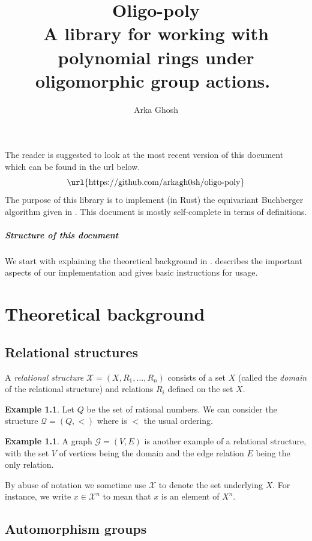 \documentclass[12pt,a4paper,article]{memoir}
\date{}
\title{Oligo-poly\\
\vspace{10pt}
\large
A library for working with polynomial rings under oligomorphic group actions.
$ $\\}
\author{Arka Ghosh}
\newcommand{\struct}{\mathcal{X}}
\newcommand{\dloQ}{\mathcal{Q}}
\newcommand{\emphdef}[1]{\emph{\textcolor{BrickRed}{#1}}}
\theoremstyle{definition}
\newtheorem{example}[theorem]{Example}
\begin{document}
\maketitle
\raggedbottom
%
\tableofcontents
%
\pagebreak
\noindent
The reader is suggested to look at the most recent version of this document which can be found in the url below.
\[
\text{
\url{https://github.com/arkagh0sh/oligo-poly}
}
\]
The purpose of this library is to implement (in Rust) the equivariant Buchberger algorithm given in \cite{GL25}.
This document is mostly self-complete in terms of definitions.
%
\paragraph*{Structure of this document}
%
We start with explaining the theoretical background in .
 describes the important aspects of our implementation and gives basic instructions for usage.
%
\chapter{Theoretical background}\label{sec:theory}
%

\section{Relational structures}
%
A \emphdef{relational structure} $\struct = (X,R_1,\dots,R_n)$ consists of a
set $X$ (called the \emphdef{domain} of the relational structure) and relations $R_i$ defined on the set $X$.
%
\begin{example}
Let $Q$ be the set of rational numbers.
We can consider the structure $\dloQ = (Q,<)$ where is $<$ the usual ordering.
\end{example}
%
\begin{example}
A graph $\mathcal{G} = (V,E)$ is another example of a relational structure,
with the set $V$ of vertices being the domain and the edge relation $E$ being the only relation.
\end{example}

By abuse of notation we sometime use $\struct$ to denote the set underlying $X$.
For instance,
we write $x \in\struct^n$ to mean that $x$ is an element of $X^n$.

\section{Automorphism groups}
\end{document}
